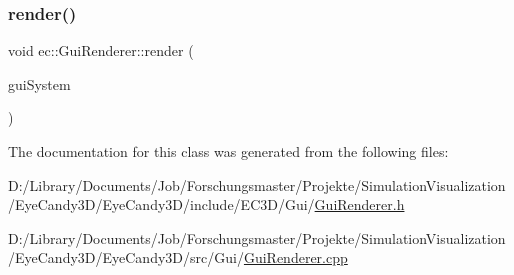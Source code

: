 \mbox{\label{classec_1_1_gui_renderer_af9573af245feb6ab252fb6c060344e7b}} 
\subsubsection{\texorpdfstring{render()}{render()}}
{\footnotesize\ttfamily void ec\+::\+Gui\+Renderer\+::render (\begin{DoxyParamCaption}\item[{const \mbox{\hyperlink{classec_1_1_gui_system}{Gui\+System}} \&}]{gui\+System }\end{DoxyParamCaption})}



The documentation for this class was generated from the following files\+:\begin{DoxyCompactItemize}
\item 
D\+:/\+Library/\+Documents/\+Job/\+Forschungsmaster/\+Projekte/\+Simulation\+Visualization/\+Eye\+Candy3\+D/\+Eye\+Candy3\+D/include/\+E\+C3\+D/\+Gui/\mbox{\hyperlink{_gui_renderer_8h}{Gui\+Renderer.\+h}}\item 
D\+:/\+Library/\+Documents/\+Job/\+Forschungsmaster/\+Projekte/\+Simulation\+Visualization/\+Eye\+Candy3\+D/\+Eye\+Candy3\+D/src/\+Gui/\mbox{\hyperlink{_gui_renderer_8cpp}{Gui\+Renderer.\+cpp}}\end{DoxyCompactItemize}
